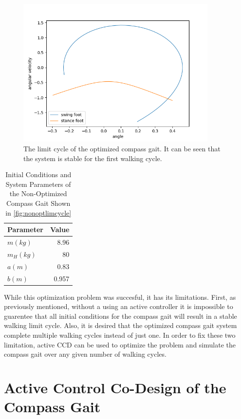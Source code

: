 \documentclass[smallextended]{./springer/svjour3}
\begin{document}
\begin{figure}[h]
\centering
\includegraphics[width=10cm]{./figures/passiveopt_limitcycle.png}
\caption{The limit cycle of the optimized compass gait. It can be seen that the system is stable for the first walking cycle.}
\label{fig:passiveopt}
\end{figure}

\begin{table}[h]
\centering
\caption{Initial Conditions and System Parameters of the Non-Optimized Compass Gait Shown in \ref{fig:nonoptlimcycle}}
\begin{tabular}{lr}
\toprule
Parameter & Value \\
\midrule
$m (kg)$ & 8.96 \\
$m_H (kg)$ & 80 \\
$a (m)$ & 0.83 \\
$b (m)$ & 0.957 \\
\bottomrule
\end{tabular}
\label{tab:optparam}
\end{table}

While this optimization problem was succesful, it has its limitations. First, as previously mentioned, without a using an active controller
it is impossible to guarentee that all initial conditions for the compass gait will result in a stable walking limit cycle. Also, it is desired that the optimized
compass gait system complete multiple walking cycles instead of just one. In order to fix these two limitation, active CCD can be used to optimize the problem 
and simulate the compass gait over any given number of walking cycles.


\section{Active Control Co-Design of the Compass Gait}
\end{document}
